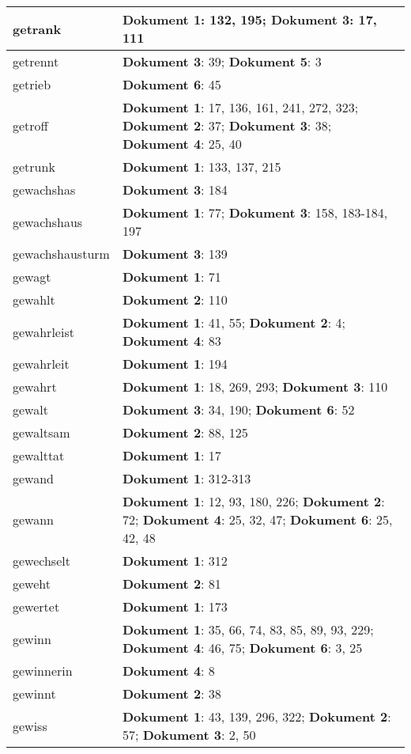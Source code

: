 \documentclass[a5paper]{article}
\begin{document}
\begin{longtable}[l]{|l|p{3in}|}
\hline
getrank & \textbf{Dokument 1}: 132, 195; \textbf{Dokument 3}: 17, 111 \\
\hline
getrennt & \textbf{Dokument 3}: 39; \textbf{Dokument 5}: 3 \\
\hline
getrieb & \textbf{Dokument 6}: 45 \\
\hline
getroff & \textbf{Dokument 1}: 17, 136, 161, 241, 272, 323; \textbf{Dokument 2}: 37; \textbf{Dokument 3}: 38; \textbf{Dokument 4}: 25, 40 \\
\hline
getrunk & \textbf{Dokument 1}: 133, 137, 215 \\
\hline
gewachshas & \textbf{Dokument 3}: 184 \\
\hline
gewachshaus & \textbf{Dokument 1}: 77; \textbf{Dokument 3}: 158, 183-184, 197 \\
\hline
gewachshausturm & \textbf{Dokument 3}: 139 \\
\hline
gewagt & \textbf{Dokument 1}: 71 \\
\hline
gewahlt & \textbf{Dokument 2}: 110 \\
\hline
gewahrleist & \textbf{Dokument 1}: 41, 55; \textbf{Dokument 2}: 4; \textbf{Dokument 4}: 83 \\
\hline
gewahrleit & \textbf{Dokument 1}: 194 \\
\hline
gewahrt & \textbf{Dokument 1}: 18, 269, 293; \textbf{Dokument 3}: 110 \\
\hline
gewalt & \textbf{Dokument 3}: 34, 190; \textbf{Dokument 6}: 52 \\
\hline
gewaltsam & \textbf{Dokument 2}: 88, 125 \\
\hline
gewalttat & \textbf{Dokument 1}: 17 \\
\hline
gewand & \textbf{Dokument 1}: 312-313 \\
\hline
gewann & \textbf{Dokument 1}: 12, 93, 180, 226; \textbf{Dokument 2}: 72; \textbf{Dokument 4}: 25, 32, 47; \textbf{Dokument 6}: 25, 42, 48 \\
\hline
gewechselt & \textbf{Dokument 1}: 312 \\
\hline
geweht & \textbf{Dokument 2}: 81 \\
\hline
gewertet & \textbf{Dokument 1}: 173 \\
\hline
gewinn & \textbf{Dokument 1}: 35, 66, 74, 83, 85, 89, 93, 229; \textbf{Dokument 4}: 46, 75; \textbf{Dokument 6}: 3, 25 \\
\hline
gewinnerin & \textbf{Dokument 4}: 8 \\
\hline
gewinnt & \textbf{Dokument 2}: 38 \\
\hline
gewiss & \textbf{Dokument 1}: 43, 139, 296, 322; \textbf{Dokument 2}: 57; \textbf{Dokument 3}: 2, 50 \\

\end{longtable}
\end{document}
